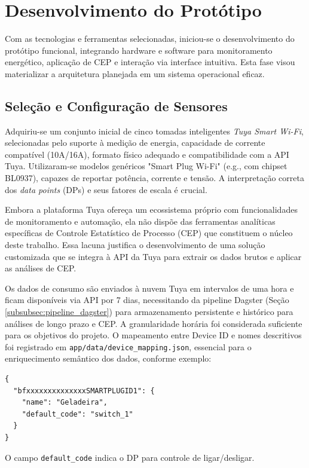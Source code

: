 \section{Desenvolvimento do Protótipo}
\label{sec:desenvolvimento_prototipo}
Com as tecnologias e ferramentas selecionadas, iniciou-se o desenvolvimento do protótipo funcional, integrando hardware e software para monitoramento energético, aplicação de CEP e interação via interface intuitiva. Esta fase visou materializar a arquitetura planejada em um sistema operacional eficaz.

\subsection{Seleção e Configuração de Sensores}
\label{subsec:configuracao_sensores}
Adquiriu-se um conjunto inicial de cinco tomadas inteligentes \textit{Tuya Smart Wi-Fi}, selecionadas pelo suporte à medição de energia, capacidade de corrente compatível (10A/16A), formato físico adequado e compatibilidade com a API Tuya. Utilizaram-se modelos genéricos "Smart Plug Wi-Fi" (e.g., com chipset BL0937), capazes de reportar potência, corrente e tensão. A interpretação correta dos \textit{data points} (DPs) e seus fatores de escala é crucial.

Embora a plataforma Tuya ofereça um ecossistema próprio com funcionalidades de monitoramento e automação, ela não dispõe das ferramentas analíticas específicas de Controle Estatístico de Processo (CEP) que constituem o núcleo deste trabalho. Essa lacuna justifica o desenvolvimento de uma solução customizada que se integra à API da Tuya para extrair os dados brutos e aplicar as análises de CEP.

Os dados de consumo são enviados à nuvem Tuya em intervalos de uma hora e ficam disponíveis via API por 7 dias, necessitando da pipeline Dagster (Seção \ref{subsubsec:pipeline_dagster}) para armazenamento persistente e histórico para análises de longo prazo e CEP. A granularidade horária foi considerada suficiente para os objetivos do projeto. O mapeamento entre Device ID e nomes descritivos foi registrado em \texttt{app/data/device\_mapping.json}, essencial para o enriquecimento semântico dos dados, conforme exemplo:
\begin{verbatim}
{
  "bfxxxxxxxxxxxxxxSMARTPLUGID1": {
    "name": "Geladeira",
    "default_code": "switch_1"
  }
}
\end{verbatim}
O campo \texttt{default\_code} indica o DP para controle de ligar/desligar.

